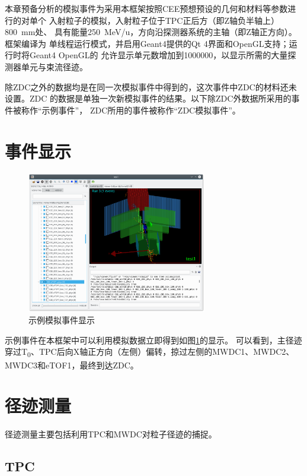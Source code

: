 \documentclass[bachelor,openany,oneside,color]{buaathesis}
\def\TZ{T\textsubscript{0}}
\begin{document}
本章预备分析的模拟事件为采用本框架按照CEE预想预设的几何和材料等参数进行的对单个
入射粒子的模拟，入射粒子位于TPC正后方（即Z轴负半轴上）\SI{800}{\milli\meter}处、
具有能量\SI{250}{\mega\eV/u}，方向沿探测器系统的主轴（即Z轴正方向）。框架编译为
单线程运行模式，并启用Geant4提供的Qt 4界面和OpenGL支持；运行时将Geant4 OpenGL的
允许显示单元数增加到1000000，以显示所需的大量探测器单元与束流径迹。

除ZDC之外的数据均是在同一次模拟事件中得到的，这次事件中ZDC的材料还未设置。ZDC
的数据是单独一次新模拟事件的结果。以下除ZDC外数据所采用的事件被称作“示例事件”，
ZDC所用的事件被称作“ZDC模拟事件”。

\section{事件显示}

\begin{figure}
	\centering
	\includegraphics[width=0.7\textwidth]{./resource/EventDisplay.png}
	\caption{示例模拟事件显示}\label{fig:EventDisplay}
\end{figure}

示例事件在本框架中可以利用模拟数据立即得到如图\ref{fig:EventDisplay}的显示。
可以看到，主径迹穿过\TZ、TPC后向X轴正方向（左侧）偏转，掠过左侧的MWDC1、MWDC2、
MWDC3和eTOF1，最终到达ZDC。

\section{径迹测量}

径迹测量主要包括利用TPC和MWDC对粒子径迹的捕捉。

\subsection{TPC}
\end{document}
